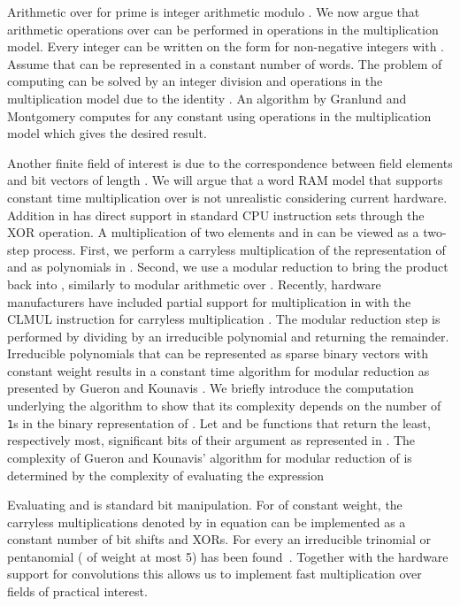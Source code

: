 \documentclass[a4paper,11pt]{article}
\theoremstyle{plain}
\theoremstyle{definition}
\begin{document}
Arithmetic over  for prime  is integer arithmetic modulo . 
We now argue that arithmetic operations over  can be performed in  operations in the multiplication model.
Every integer  can be written on the form  for non-negative integers  with .
Assume that  can be represented in a constant number of words.
The problem of computing  can be solved by an integer division and  operations in the multiplication model due to the identity .
An algorithm by Granlund and Montgomery \cite{granlund1994} computes  for any constant  using  operations in the multiplication model which gives the desired result.

Another finite field of interest is  due to the correspondence between field elements and bit vectors of length .
We will argue that a word RAM model that supports constant time multiplication over  is not unrealistic considering current hardware.
Addition in  has direct support in standard CPU instruction sets through the XOR operation.
A multiplication of two elements  and  in  can be viewed as a two-step process.
First, we perform a carryless multiplication  of the representation of  and  as polynomials in . 
Second, we use a modular reduction to bring the product  back into , similarly to modular arithmetic over . 
Recently, hardware manufacturers have included partial support for multiplication in  with the CLMUL instruction for carryless multiplication \cite{gueron2014}. 
The modular reduction step is performed by dividing  by an irreducible polynomial  and returning the remainder.
Irreducible polynomials  that can be represented as sparse binary vectors with constant weight results in a constant time algorithm for modular reduction as presented by Gueron and Kounavis \cite{gueron2014}.
We briefly introduce the computation underlying the algorithm to show that its complexity depends on the number of {\tt 1}s in the binary representation of .
Let  and  be functions that return the  least, respectively most, significant bits of their argument as represented in .  
The complexity of Gueron and Kounavis' algorithm for modular reduction of  is determined by the complexity of evaluating the expression

Evaluating  and  is standard bit manipulation. 
For  of constant weight, the carryless multiplications denoted by  in equation  can be implemented as a constant number of bit shifts and XORs. 
For every  an irreducible trinomial or pentanomial ( of weight at most 5) has been found~\cite{seroussi1998}.
Together with the hardware support for convolutions this allows us to implement fast multiplication over fields of practical interest. 
\end{document}
